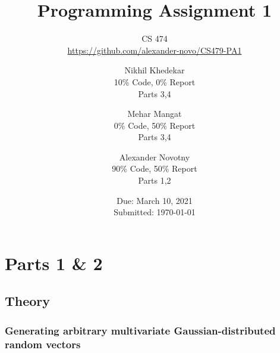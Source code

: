\documentclass[headings=optiontoheadandtoc,listof=totoc,parskip=full]{scrartcl}
\title{Programming Assignment 1}
\subtitle{CS 474\\\url{https://github.com/alexander-novo/CS479-PA1}}
\author{Nikhil Khedekar\\10\% Code, 0\% Report\\ Parts 3,4 \and Mehar Mangat\\0\% Code,  50\% Report\\ Parts 3,4  \and Alexander Novotny\\90\% Code, 50\% Report\\ Parts 1,2}
\date{Due: March 10, 2021 \\ Submitted: \today}
\begin{document}
\maketitle
\tableofcontents
{}

\newpage
{}

\section{Parts 1 \& 2}
\label{sec:part-1}

\subsection{Theory}

\subsubsection{Generating arbitrary multivariate Gaussian-distributed random vectors}
\end{document}
